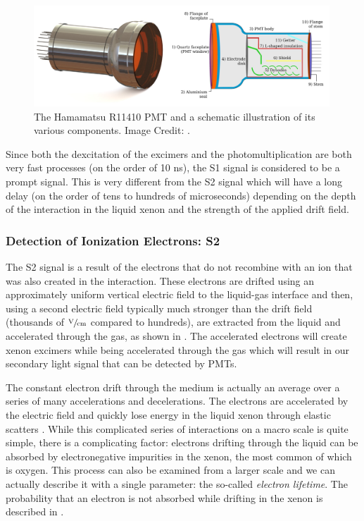  \begin{figure}[t]
	\centering
	\includegraphics[width=0.99\textwidth]{tpc_pmt}
	\caption{The Hamamatsu R11410 PMT and a schematic illustration of its various components.  Image Credit: .}
	\label{fig:tpc_pmt}
\end{figure}

Since both the dexcitation of the excimers and the photomultiplication are both very fast processes (on the order of 10 ns), the S1 signal is considered to be a prompt signal.  This is very different from the S2 signal which will have a long delay (on the order of tens to hundreds of microseconds) depending on the depth of the interaction in the liquid xenon and the strength of the applied drift field.


\subsubsection{Detection of Ionization Electrons: S2}

The S2 signal is a result of the electrons that do not recombine with an ion that was also created in the interaction.  These electrons are drifted using an approximately uniform vertical electric field to the liquid-gas interface and then, using a second electric field typically much stronger than the drift field (thousands of $\sfrac{\textrm{V}}{\textrm{cm}}$ compared to hundreds), are extracted from the liquid and accelerated through the gas, as shown in .  The accelerated electrons will create xenon excimers while being accelerated through the gas which will result in our secondary light signal that can be detected by PMTs.

The constant electron drift through the medium is actually an average over a series of many accelerations and decelerations.  The electrons are accelerated by the electric field and quickly lose energy in the liquid xenon through elastic scatters \cite{atrazhev2005electron}.  While this complicated series of interactions on a macro scale is quite simple, there is a complicating factor: electrons drifting through the liquid can be absorbed by electronegative impurities in the xenon, the most common of which is oxygen.  This process can also be examined from a larger scale and we can actually describe it with a single parameter: the so-called \textit{electron lifetime}.  The probability that an electron is not absorbed while drifting in the xenon is described in .

